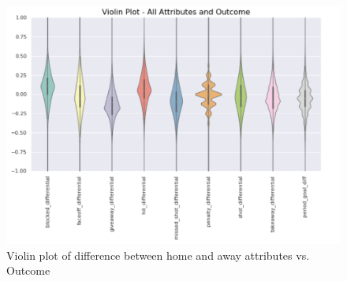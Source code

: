 \documentclass[twocolumn,letterpaper,12pt,notitlepage]{article}
\begin{document}
\begin{figure}[htp]
\centering
\includegraphics[width=\linewidth]{violin}
\caption{Violin plot of difference between home and away attributes vs. Outcome}
\label{fig:1}
\end{figure}
\end{document}
